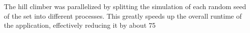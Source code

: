 The hill climber was parallelized by splitting the simulation of each random seed of the set into different processes. This greatly speeds up the overall runtime of the application, effectively reducing it by about 75%